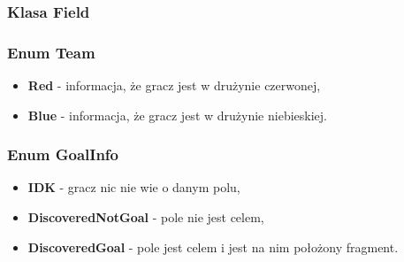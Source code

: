 \documentclass[../Dokumentacja.tex]{subfiles}
\begin{document}
\subsubsection{Klasa Field}
\begin{methods}
\end{methods}
\subsubsection{Enum Team}
\begin{itemize}
    \item \textbf{Red} - informacja, że gracz jest w drużynie czerwonej,
    \item \textbf{Blue} - informacja, że gracz jest w drużynie niebieskiej.
\end{itemize}
\subsubsection{Enum GoalInfo}
\begin{itemize}
    \item \textbf{IDK} - gracz nic nie wie o danym polu,
    \item \textbf{DiscoveredNotGoal} - pole nie jest celem,
    \item \textbf{DiscoveredGoal} - pole jest celem i jest na nim położony fragment.
\end{itemize}
\end{document}
